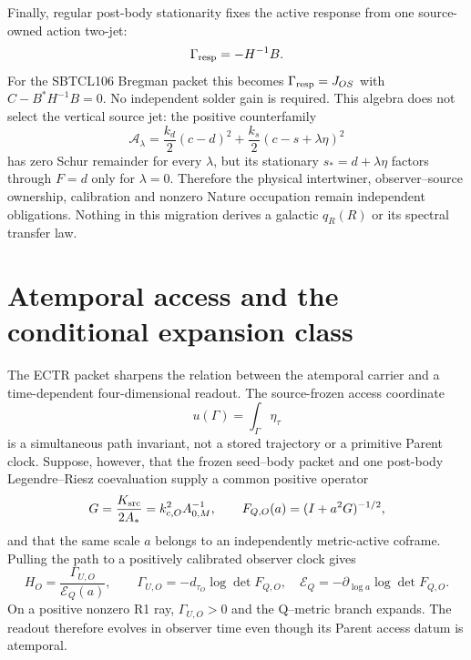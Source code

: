 \documentclass[11pt]{article}
\begin{document}
Finally, regular post-body stationarity fixes the active response from one
source-owned action two-jet:
\begin{equation}
 \Gamma_{\rm resp}=-H^{-1}B.
 \label{eq:synthesis-mixed-hessian-solder}
\end{equation}
For the SBTCL106 Bregman packet this becomes
\(\Gamma_{\rm resp}=J_{OS}\) with \(C-B^*H^{-1}B=0\).  No independent solder
gain is required.  This algebra does not select the vertical source jet: the
positive counterfamily
\begin{equation}
 \mathcal A_\lambda=\frac{k_d}{2}(c-d)^2
  +\frac{k_s}{2}(c-s+\lambda\eta)^2
 \label{eq:synthesis-solder-counterfamily}
\end{equation}
has zero Schur remainder for every \(\lambda\), but its stationary
\(s_*=d+\lambda\eta\) factors through \(F=d\) only for \(\lambda=0\).
Therefore the physical intertwiner, observer--source ownership, calibration
and nonzero Nature occupation remain independent obligations.  Nothing in
this migration derives a galactic \(q_R(R)\) or its spectral transfer law.

\section{Atemporal access and the conditional expansion class}

The ECTR packet sharpens the relation between the atemporal carrier and a
time-dependent four-dimensional readout.  The source-frozen access coordinate
\begin{equation}
 u(\Gamma)=\int_\Gamma\eta_\tau
 \label{eq:synthesis-ectr-access}
\end{equation}
is a simultaneous path invariant, not a stored trajectory or a primitive
Parent clock.  Suppose, however, that the frozen seed--body packet and one
post-body Legendre--Riesz coevaluation supply a common positive operator
\begin{equation}
 G=\frac{K_{\rm src}}{2A_*}=k_{c,O}^2A_{0,M}^{-1},
 \qquad F_{Q,O}(a)=(I+a^2G)^{-1/2},
 \label{eq:synthesis-ectr-lock}
\end{equation}
and that the same scale $a$ belongs to an independently metric-active
coframe.  Pulling the path to a positively calibrated observer clock gives
\begin{equation}
 \boxed{H_O=\frac{\Gamma_{U,O}}{\mathcal E_Q(a)}},\qquad
 \Gamma_{U,O}=-d_{\tau_O}\log\det F_{Q,O},\quad
 \mathcal E_Q=-\partial_{\log a}\log\det F_{Q,O}.
 \label{eq:synthesis-ectr-classifier}
\end{equation}
On a positive nonzero R1 ray, $\Gamma_{U,O}>0$ and the Q--metric branch
expands.  The readout therefore evolves in observer time even though its
Parent access datum is atemporal.
\end{document}
